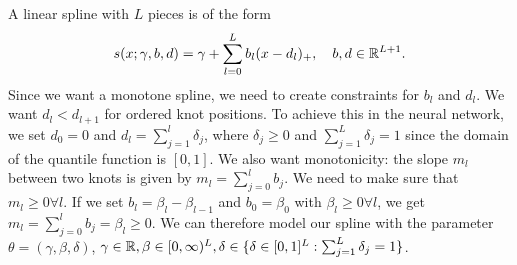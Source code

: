 A linear spline with \(L\) pieces is of the form 
\[ s(x; \gamma, b, d) = \gamma + \sum_{l=0}^L b_l (x - d_l)_+, 
\quad b, d \in \mathbb{R}^{L+1}. \]
Since we want a monotone spline, we need to create constraints for \(b_l\) and \(d_l\).
We want \(d_l < d_{l+1}\) for ordered knot positions. To achieve this 
in the neural network, we set \(d_0 = 0\) and \(d_l = \sum_{j=1}^l \delta_j\), 
where \(\delta_j \geq 0\) and \(\sum_{j=1}^L \delta_j = 1\) since the domain 
of the quantile function is \([0, 1]\). 
We also want monotonicity: the slope \(m_l\) between two knots is given by 
\(m_l = \sum_{j=0}^l b_j\). We need to make sure that \(m_l \geq 0 \forall l\).
If we set \(b_l = \beta_l - \beta_{l-1}\) and \(b_0 = \beta_0\) with \(\beta_l \geq 0 \forall l\), 
we get \(m_l = \sum_{j=0}^l b_j = \beta_l \geq 0\).
We can therefore model our spline with the parameter 
\(\theta = (\gamma, \beta, \delta)\), \(\gamma \in \mathbb{R}, \beta \in [0,\infty)^{L}, 
\delta \in \{ \delta \in [0,1]^L: \sum_{j=1}^L \delta_j = 1 \}\).